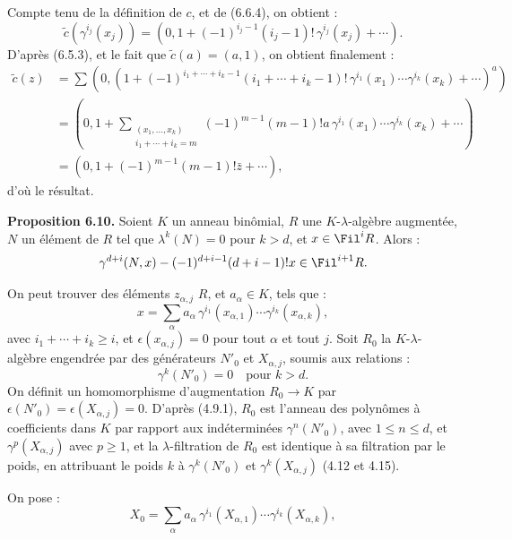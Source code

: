 Compte tenu de la définition de \(c\), et de (6.6.4), on obtient :
\[
  \widetilde c(\gamma^{i_j}(x_j))
  =
  \left(0,1+(-1)^{i_j-1}(i_j-1)!\,\gamma^{i_j}(x_j)+\cdots\right).
\]
D'après (6.5.3), et le fait que \(\widetilde c(a)=(a,1)\), on obtient finalement :
\[
\begin{aligned}
\widetilde c(z)
&=\sum
\left(0,\left(1+
(-1)^{i_1+\cdots+i_k-1}
(i_1+\cdots+i_k-1)!
\,\gamma^{i_1}(x_1)\cdots\gamma^{i_k}(x_k)
+\cdots\right)^a\right)\\
&=
\left(0,1+
\sum_{\substack{(x_1,\ldots,x_k)\\ i_1+\cdots+i_k=m}}
(-1)^{m-1}(m-1)!a\,\gamma^{i_1}(x_1)\cdots\gamma^{i_k}(x_k)
+\cdots\right)\\
&=
(0,1+(-1)^{m-1}(m-1)!\bar z+\cdots),
\end{aligned}
\]
d'où le résultat.

\textbf{Proposition 6.10.} Soient \(K\) un anneau binômial, \(R\) une \(K\)-\(\lambda\)-algèbre augmentée, \(N\) un élément de \(R\) tel que \(\lambda^k(N)=0\) pour \(k>d\), et \(x\in\Fil^iR\). Alors :
\[
  \gamma^{d+i}(N,x)-(-1)^{d+i-1}(d+i-1)!x\in\Fil^{i+1}R.
\]

On peut trouver des éléments \(z_{\alpha,j}\) \(R\), et \(a_\alpha\in K\), tels que :
\[
  x=\sum_\alpha a_\alpha\,
       \gamma^{i_1}(x_{\alpha,1})\cdots
       \gamma^{i_k}(x_{\alpha,k}),
\]
avec \(i_1+\cdots+i_k\ge i\), et \(\epsilon(x_{\alpha,j})=0\) pour tout \(\alpha\) et tout \(j\). Soit \(R_0\) la \(K\)-\(\lambda\)-algèbre engendrée par des générateurs \(N'_0\) et \(X_{\alpha,j}\), soumis aux relations :
\[
  \gamma^k(N'_0)=0\quad\text{pour }k>d.
\]
On définit un homomorphisme d'augmentation \(R_0\to K\) par \(\epsilon(N'_0)=\epsilon(X_{\alpha,j})=0\). D'après (4.9.1), \(R_0\) est l'anneau des polynômes à coefficients dans \(K\) par rapport aux indéterminées \(\gamma^n(N'_0)\), avec \(1\le n\le d\), et \(\gamma^p(X_{\alpha,j})\) avec \(p\ge1\), et la \(\lambda\)-filtration de \(R_0\) est identique à sa filtration par le poids, en attribuant le poids \(k\) à \(\gamma^k(N'_0)\) et \(\gamma^k(X_{\alpha,j})\) (4.12 et 4.15).

On pose :
\[
  X_0=\sum_\alpha a_\alpha\,
       \gamma^{i_1}(X_{\alpha,1})\cdots
       \gamma^{i_k}(X_{\alpha,k}),
\]
